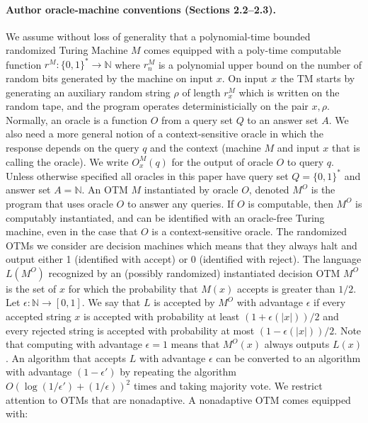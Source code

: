 \documentclass[10pt,a4paper]{article}
\begin{document}
\paragraph{Author oracle-machine conventions (Sections 2.2--2.3).}
We assume without loss of generality that a polynomial-time bounded randomized Turing Machine $M$ comes equipped with a poly-time computable function $r^M:\{0,1\}^*\to\mathbb N$ where $r_n^M$ is a polynomial upper bound on the number of random bits generated by the machine on input $x$. On input $x$ the TM starts by generating an auxiliary random string $\rho$ of length $r_x^M$ which is written on the random tape, and the program operates deterministicially on the pair $x,\rho$.
Normally, an oracle is a function $O$ from a query set $Q$ to an answer set $A$. We also need a more general notion of a context-sensitive oracle in which the response depends on the query $q$ and the context (machine $M$ and input $x$ that is calling the oracle). We write $O_x^M(q)$ for the output of oracle $O$ to query $q$.
Unless otherwise specified all oracles in this paper have query set $Q=\{0,1\}^*$ and answer set $A=\mathbb N$.
An OTM $M$ instantiated by oracle $O$, denoted $M^O$ is the program that uses oracle $O$ to answer any queries. If $O$ is computable, then $M^O$ is computably instantiated, and can be identified with an oracle-free Turing machine, even in the case that $O$ is a context-sensitive oracle.
The randomized OTMs we consider are decision machines which means that they always halt and output either 1 (identified with accept) or 0 (identified with reject). The language $L(M^O)$ recognized by an (possibly randomized) instantiated decision OTM $M^O$ is the set of $x$ for which the probability that $M(x)$ accepts is greater than $1/2$.
Let $\epsilon:\mathbb N\to[0,1]$. We say that $L$ is accepted by $M^O$ with advantage $\epsilon$ if every accepted string $x$ is accepted with probability at least $(1+\epsilon(|x|))/2$ and every rejected string is accepted with probability at most $(1-\epsilon(|x|))/2$. Note that computing with advantage $\epsilon=1$ means that $M^O(x)$ always outputs $L(x)$.
An algorithm that accepts $L$ with advantage $\epsilon$ can be converted to an algorithm with advantage $(1-\epsilon')$ by repeating the algorithm $O(\log(1/\epsilon')+(1/\epsilon))^2$ times and taking majority vote.
We restrict attention to OTMs that are nonadaptive. A nonadaptive OTM comes equipped with:
\end{document}
